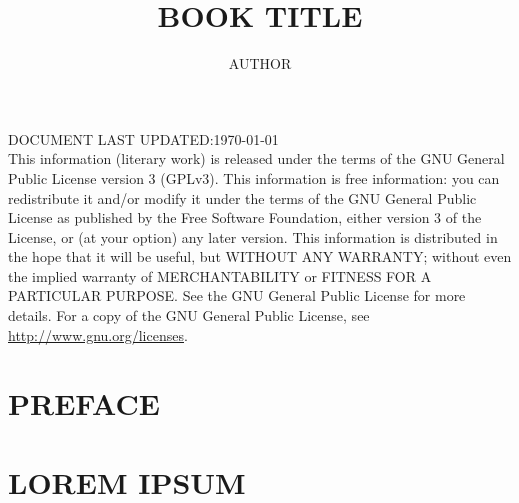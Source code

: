 \documentclass[oneside]{book}
\begin{document}
\pagecolor{yellow!50!orange!40}

\setlength{\parindent}{0 pt}

\title{\textbf{BOOK TITLE}}
\author{AUTHOR}
\date{}

\thispagestyle{empty}
\maketitle

\thispagestyle{empty}
DOCUMENT LAST UPDATED:\hfill\RFSdateTimeA\today\\

This information (literary work) is released under the terms of the GNU General Public License version 3 (GPLv3). This information is free information: you can redistribute it and/or modify it under the terms of the GNU General Public License as published by the Free Software Foundation, either version 3 of the License, or (at your option) any later version. This information is distributed in the hope that it will be useful, but WITHOUT ANY WARRANTY; without even the implied warranty of MERCHANTABILITY or FITNESS FOR A PARTICULAR PURPOSE. See the GNU General Public License for more details. For a copy of the GNU General Public License, see \url{http://www.gnu.org/licenses}.
\newpage

\renewcommand{\cftchapdotsep}{\cftdotsep}
\renewcommand*\contentsname{\Large CONTENTS}
\tableofcontents
\thispagestyle{empty}

\pagestyle{plain}

\chapter*{PREFACE}

\lipsum[1]

\chapter{LOREM IPSUM}

\lipsum[2-10]
\end{document}
